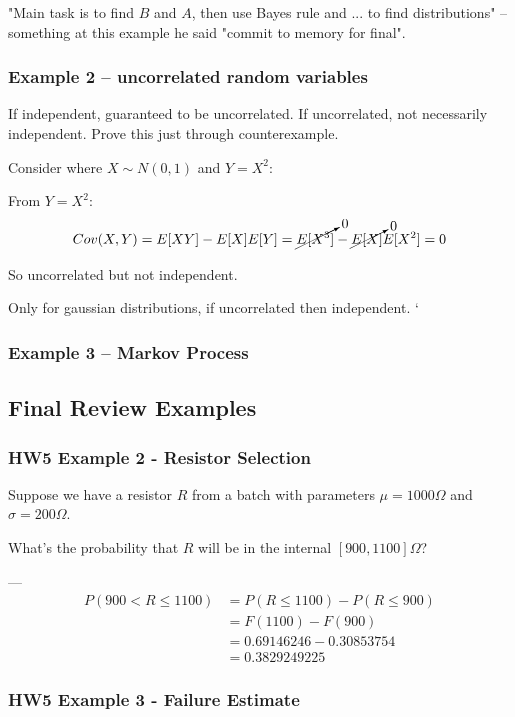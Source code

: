 \documentclass{report}
\begin{document}
"Main task is to find $B$ and $A$, then use Bayes rule and ... to find distributions" -- something at this example he said "commit to memory for final". 


\subsubsection{Example 2 -- uncorrelated random variables}

If independent, guaranteed to be uncorrelated. If uncorrelated, not necessarily independent. Prove this just through counterexample. 

Consider where $X \sim N(0,1)$ and $Y=X^2$:

From $Y=X^2$: $$Cov(X,Y) = E[XY] - E[X]E[Y] = \cancelto{0}{ E[X^3]} - \cancelto{0}{E[X]}E[X^2] = 0$$

So uncorrelated but not independent.

Only for gaussian distributions, if uncorrelated then independent. `


\subsubsection{Example 3 -- Markov Process}


\subsection{Final Review Examples}

\subsubsection{HW5 Example 2 - Resistor Selection}

Suppose we have a resistor $R$ from a batch with parameters $\mu=1000\Omega$ and $\sigma=200\Omega$. 

What's the probability that $R$ will be in the internal $[900, 1100]\Omega$?

--- \begin{align*}
P(900 < R \leq 1100) & = P(R \leq 1100) - P(R \leq 900) \\
& = F(1100) - F(900) \\
& = 0.69146246 - 0.30853754 \\
& = 0.3829249225
\end{align*}

\subsubsection{HW5 Example 3 - Failure Estimate}
\end{document}

